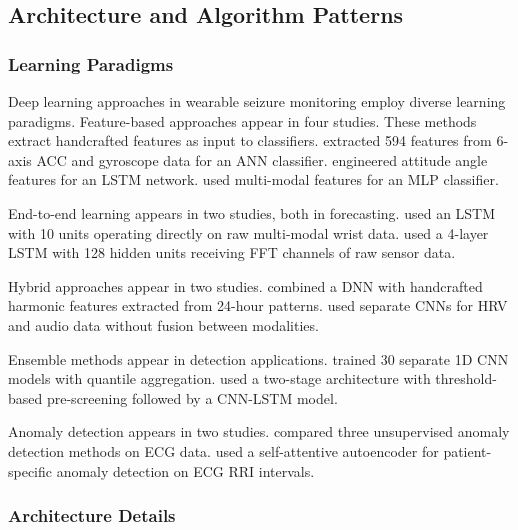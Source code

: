 \subsection{Architecture and Algorithm Patterns}
\label{sec:architecture-patterns}

\subsubsection{Learning Paradigms}

Deep learning approaches in wearable seizure monitoring employ diverse learning paradigms. Feature-based approaches appear in four studies. These methods extract handcrafted features as input to classifiers. \textcite{fineDetectionKeyAutomated2025} extracted 594 features from 6-axis ACC and gyroscope data for an ANN classifier. \textcite{wangEpilepticSeizureDetection2025} engineered attitude angle features for an LSTM network. \textcite{singhrathoreDevelopmentMultimodalMachine2024} used multi-modal features for an MLP classifier.

End-to-end learning appears in two studies, both in forecasting. \textcite{meiselMachineLearningWristband2020} used an LSTM with 10 units operating directly on raw multi-modal wrist data. \textcite{nasseriAmbulatorySeizureForecasting2021} used a 4-layer LSTM with 128 hidden units receiving FFT channels of raw sensor data.

Hybrid approaches appear in two studies. \textcite{vielufSeizureMonitoringCombined2025} combined a DNN with handcrafted harmonic features extracted from 24-hour patterns. \textcite{elemamAutomatedValidatedTool2025} used separate CNNs for HRV and audio data without fusion between modalities.

Ensemble methods appear in detection applications. \textcite{spahrDeepLearningbasedDetection2025} trained 30 separate 1D CNN models with quantile aggregation. \textcite{dongTwoLayerEnsembleMethod2022} used a two-stage architecture with threshold-based pre-screening followed by a CNN-LSTM model.

Anomaly detection appears in two studies. \textcite{reintjesECGBasedDetectionEpileptic2025} compared three unsupervised anomaly detection methods on ECG data. \textcite{odeDevelopmentEpilepticSeizure2023} used a self-attentive autoencoder for patient-specific anomaly detection on ECG RRI intervals.

\subsubsection{Architecture Details}

